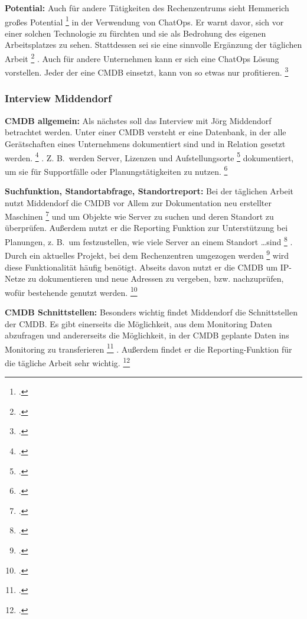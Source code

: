 \textbf{Potential: }Auch für andere Tätigkeiten des Rechenzentrums sieht Hemmerich \glqq{}großes Potential\grqq
\footcite[][o. \pno]{Hemm_2019}
 in der Verwendung von ChatOps.
 Er warnt davor, sich vor einer solchen Technologie zu fürchten und sie als Bedrohung des eigenen Arbeitsplatzes zu sehen. Stattdessen sei sie eine \glqq{}sinnvolle Ergänzung der täglichen Arbeit\grqq
\footcite[][o. \pno]{Hemm_2019}
. Auch für andere Unternehmen kann er sich eine ChatOps Lösung vorstellen. \glqq{}Jeder der eine CMDB einsetzt, kann von so etwas nur profitieren.\grqq
\footcites[][o. \pno]{Hemm_2019}[Vgl.][o. \pno]{Hemm_2019}



\subsubsection{Interview Middendorf}
\textbf{CMDB allgemein: }Als nächstes soll das Interview mit Jörg Middendorf betrachtet werden. Unter einer \acs{CMDB} versteht er eine Datenbank, in der \glqq{}alle Gerätschaften eines Unternehmens dokumentiert sind und in Relation gesetzt werden\grqq.
\footcite[][o. \pno]{Midd_2019}
.
Z. B.~werden \glqq{}Server, Lizenzen und Aufstellungsorte\grqq
\footcite[][o. \pno]{Midd_2019}
 dokumentiert, um sie für Supportfälle oder Planungstätigkeiten zu nutzen.
\footcite[Vgl.][o. \pno]{Midd_2019}

\textbf{Suchfunktion, Standortabfrage, Standortreport: }Bei der täglichen Arbeit nutzt Middendorf die \acs{CMDB} vor Allem zur \glqq{}Dokumentation neu erstellter Maschinen\grqq
\footcite[][o. \pno]{Midd_2019}
 und um Objekte wie Server zu suchen und deren Standort zu überprüfen. Außerdem nutzt er die Reporting Funktion zur Unterstützung bei Planungen, z. B.~um festzustellen, \glqq{}wie viele Server an einem Standort \ldots sind\grqq
\footcite[][o. \pno]{Midd_2019}
. Durch ein aktuelles \glqq{}Projekt, bei dem Rechenzentren umgezogen werden\grqq
\footcite[][o. \pno]{Midd_2019}
 wird diese Funktionalität häufig benötigt. Abseits davon nutzt er die \acs{CMDB} um IP-Netze zu dokumentieren und neue Adressen zu vergeben, bzw. nachzuprüfen, wofür bestehende genutzt werden.
\footcite[Vgl.][o. \pno]{Midd_2019}

\textbf{CMDB Schnittstellen: }Besonders wichtig findet Middendorf die Schnittstellen der \acs{CMDB}. Es gibt einerseits die Möglichkeit, aus dem Monitoring Daten abzufragen und andererseits die Möglichkeit, in \glqq{}der CMDB geplante Daten ins Monitoring zu transferieren\grqq
\footcite[][o. \pno]{Midd_2019}
.
Außerdem findet er die Reporting-Funktion für die tägliche Arbeit sehr wichtig.
\footcite[Vgl.][o. \pno]{Midd_2019}

